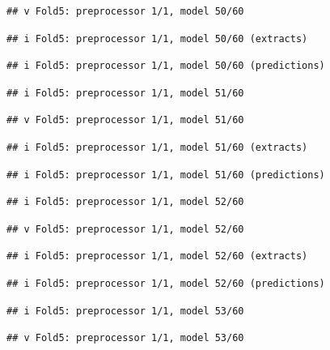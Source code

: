 \documentclass[
]{article}
\begin{document}
\begin{verbatim}
## v Fold5: preprocessor 1/1, model 50/60
\end{verbatim}

\begin{verbatim}
## i Fold5: preprocessor 1/1, model 50/60 (extracts)
\end{verbatim}

\begin{verbatim}
## i Fold5: preprocessor 1/1, model 50/60 (predictions)
\end{verbatim}

\begin{verbatim}
## i Fold5: preprocessor 1/1, model 51/60
\end{verbatim}

\begin{verbatim}
## v Fold5: preprocessor 1/1, model 51/60
\end{verbatim}

\begin{verbatim}
## i Fold5: preprocessor 1/1, model 51/60 (extracts)
\end{verbatim}

\begin{verbatim}
## i Fold5: preprocessor 1/1, model 51/60 (predictions)
\end{verbatim}

\begin{verbatim}
## i Fold5: preprocessor 1/1, model 52/60
\end{verbatim}

\begin{verbatim}
## v Fold5: preprocessor 1/1, model 52/60
\end{verbatim}

\begin{verbatim}
## i Fold5: preprocessor 1/1, model 52/60 (extracts)
\end{verbatim}

\begin{verbatim}
## i Fold5: preprocessor 1/1, model 52/60 (predictions)
\end{verbatim}

\begin{verbatim}
## i Fold5: preprocessor 1/1, model 53/60
\end{verbatim}

\begin{verbatim}
## v Fold5: preprocessor 1/1, model 53/60
\end{verbatim}
\end{document}
